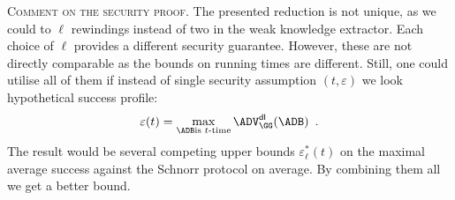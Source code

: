 \documentclass{crypto-exercise}
\begin{document}
\begin{solution}
\vspace*{2ex}
\noindent
\textsc{Comment on the security proof.} The presented reduction is not unique, as we could to $\ell$ rewindings instead of two in the weak knowledge extractor. Each choice of $\ell$ provides a different security guarantee. However, these are not directly comparable as the bounds on running times are different. Still, one could utilise all of them if instead of single security assumption $(t,\varepsilon)$ we look hypothetical success profile:
\begin{align*}
\varepsilon(t)=\max_{\ADB\text{is $t$-time}} \ADVDL{\GG}{\ADB}\enspace.
\end{align*}  
The result would be several competing upper bounds $\varepsilon_\ell^*(t)$ on the maximal average success against the Schnorr protocol on average. By combining them all we get a better bound. 

\end{solution}
\end{document}
